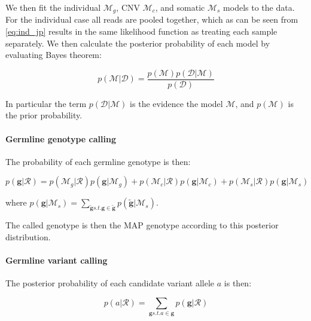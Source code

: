 \documentclass{article}
\begin{document}
We then fit the individual $\mathcal{M}_g$, CNV $\mathcal{M}_c$, and somatic $\mathcal{M}_s$ models to the data. For the individual case all reads are pooled together, which as can be seen from \ref{eq:ind_jp} results in the same likelihood function as treating each sample separately. We then calculate the posterior probability of each model by evaluating Bayes theorem:

\begin{equation}
\label{eq:bayes_model}
p(\mathcal{M} | \mathcal{D}) = \frac{p(\mathcal{M})p(\mathcal{D} | \mathcal{M})}{p(\mathcal{D})}
\end{equation}

In particular the term $p(\mathcal{D} | \mathcal{M})$  is the evidence the model $\mathcal{M}$, and $p(\mathcal{M})$ is the prior probability.

\paragraph{Germline genotype calling}

The probability of each germline genotype is then:

\begin{equation}
\label{eq:som_germline_genotype}
p(\boldsymbol{g} | \mathcal{R}) = p(\mathcal{M}_g | \mathcal{R}) p(\boldsymbol{g} | \mathcal{M}_g) + p(\mathcal{M}_c | \mathcal{R}) p(\boldsymbol{g} | \mathcal{M}_c) + p(\mathcal{M}_s | \mathcal{R}) p(\boldsymbol{g} | \mathcal{M}_s)
\end{equation}

\noindent where $p(\boldsymbol{g} | \mathcal{M}_s) = \sum_{\tilde{\boldsymbol{g}} s.t. \boldsymbol{g} \in \tilde{\boldsymbol{g}}} p(\tilde{\boldsymbol{g}} | \mathcal{M}_s)$.

The called genotype is then the MAP genotype according to this posterior distribution.

\paragraph{Germline variant calling}

The posterior probability of each candidate variant allele $a$ is then:

\begin{equation}
\label{eq:som_germline_candidate}
p(a | \mathcal{R}) = \sum_{\boldsymbol{g} s.t. a \in \boldsymbol{g}} p(\boldsymbol{g} | \mathcal{R})
\end{equation}
\end{document}
